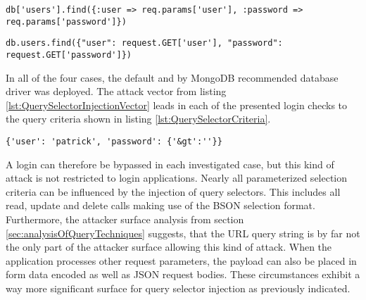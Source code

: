 \begin{lstlisting}[caption={Vulnerable Ruby example for query selector injection on MongoDB}, label={lst:RubyQuerySelectorInjection}]
db['users'].find({:user => req.params['user'], :password => req.params['password']})
\end{lstlisting}

\begin{lstlisting}[caption={Vulnerable Python example for query selector injection on MongoDB}, label={lst:PythonQuerySelectorInjection}]
db.users.find({"user": request.GET['user'], "password": request.GET['password']})
\end{lstlisting}

In all of the four cases, the default and by MongoDB recommended database driver was deployed. The attack vector from listing \ref{lst:QuerySelectorInjectionVector} leads in each of the presented login checks to the query criteria shown in listing \ref{lst:QuerySelectorCriteria}. \\

\begin{lstlisting}[caption={Resulting query of query selector injection}, label={lst:QuerySelectorCriteria}]
{'user': 'patrick', 'password': {'&gt':''}}
\end{lstlisting}

A login can therefore be bypassed in each investigated case, but this kind of attack is not restricted to login applications. Nearly all parameterized selection criteria can be influenced by the injection of query selectors. This includes all read, update and delete calls making use of the BSON selection format. Furthermore, the attacker surface analysis from section \ref{sec:analysisOfQueryTechniques} suggests, that the URL query string is by far not the only part of the attacker surface allowing this kind of attack. When the application processes other request parameters, the payload can also be placed in form data encoded as well as JSON request bodies. These circumstances exhibit a way more significant surface for query selector injection as previously indicated. \\


